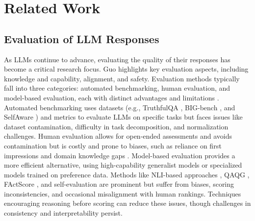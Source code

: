 \documentclass{article}
\theoremstyle{plain}
\theoremstyle{definition}
\theoremstyle{remark}
\begin{document}
\section{Related Work}

\subsection{Evaluation of LLM Responses} 
As LLMs continue to advance, evaluating the quality of their responses has become a critical research focus. Guo \cite{1-guo2023evaluating} highlights key evaluation aspects, including knowledge and capability, alignment, and safety. Evaluation methods typically fall into three categories: automated benchmarking, human evaluation, and model-based evaluation, each with distinct advantages and limitations \cite{2-huggingface2023llmevaluation}.
Automated benchmarking uses datasets (e.g., TruthfulQA \cite{3-lin2021truthfulqa}, BIG-bench \cite{4-srivastava2022beyond}, and SelfAware \cite{5-yin2023large}) and metrics to evaluate LLMs on specific tasks \cite{zhang2022mme} \cite{zhang2019bertscore} but faces issues like dataset contamination, difficulty in task decomposition, and normalization challenges. Human evaluation allows for open-ended assessments and avoids contamination but is costly and prone to biases, such as reliance on first impressions and domain knowledge gaps \cite{13-wang2023aligning}.
Model-based evaluation provides a more efficient alternative, using high-capability generalist models or specialized models trained on preference data. Methods like NLI-based approaches \cite{6-maynez2020faithfulness}, QAQG \cite{7-manakul2023mqag}, FActScore \cite{8-min2023factscore}, and self-evaluation \cite{9-manakul2023selfcheckgpt} are prominent but suffer from biases, scoring inconsistencies, and occasional misalignment with human rankings. Techniques encouraging reasoning before scoring can reduce these issues, though challenges in consistency and interpretability persist.
\end{document}
